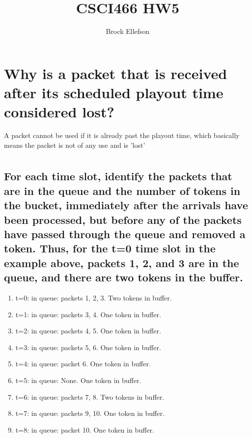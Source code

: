 \documentclass[10pt,a4paper]{article}
\author{Brock Ellefson}
\title{CSCI466 HW5}
\begin{document}
\maketitle
\section{Why is a packet that is received after its scheduled playout time considered lost?}
A packet cannot be used if it is already past the playout time, which basically means the packet is not of any use and is 'lost'

\section{}
\subsection{For each time slot, identify the packets that are in the queue and the number of tokens in the bucket, immediately after the arrivals have been processed, but before any of the packets have passed through the queue and removed a token. Thus, for the t=0 time slot in the example above, packets 1, 2, and 3 are in the queue, and there are two tokens in the buffer.}
\begin{enumerate} 
	\item{t=0: in queue: packets 1, 2, 3. Two tokens in buffer.}
	\item{t=1: in queue: packets 3, 4. One token in buffer.}
	\item{t=2: in queue: packets 4, 5. One token in buffer.}
	\item{t=3: in queue: packets 5, 6. One token in buffer.}
	\item{t=4: in queue: packet 6. One token in buffer.}
	\item{t=5: in queue: None. One token in buffer.}
	\item{t=6: in queue: packets 7, 8. Two tokens in buffer.}
	\item{t=7: in queue: packets 9, 10. One token in buffer.}
	\item{t=8: in queue: packet 10. One token in buffer.}
\end{enumerate}	
	
\end{document}
